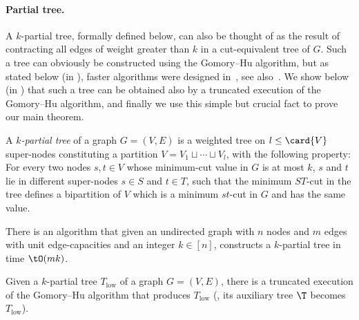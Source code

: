 \paragraph{Partial tree.}
A $k$-partial tree, formally defined below, can also be thought of as
the result of contracting all edges of weight greater than $k$
in a cut-equivalent tree of $G$.
Such a tree can obviously be constructed using the Gomory--Hu algorithm,
but as stated below (in ),
faster algorithms were designed in~\cite{HKP07,BHKP07},
see also~\cite[Theorem $3$]{Panigrahi16}.
We show below (in ) that such a tree
can be obtained also by a truncated execution of the Gomory--Hu algorithm,
and finally we use this simple but crucial fact to prove our main theorem.


\begin{definition}
  A \emph{$k$-partial tree} of a graph $G=(V,E)$ is a weighted tree on $l\leq \card{V}$ super-nodes constituting a partition $V=V_1 \sqcup\cdots\sqcup V_l$, with the following property:
  For every two nodes $s,t\in V$ whose minimum-cut value in $G$ is at most $k$, $s$ and $t$ lie in different super-nodes $s\in S$ and $t\in T$, such that the minimum $ST$-cut in the tree defines a bipartition of $V$
  which is a minimum $st$-cut in $G$ and has the same value.
\end{definition}

\begin{lemma}
\label{Lemma:Partial}
There is an algorithm that given an undirected graph with $n$ nodes and $m$ edges with unit edge-capacities and an integer $k\in [n]$, constructs a $k$-partial tree in time $\tO(mk)$.
\end{lemma}

\begin{lemma} \label{lem:truncatedGH}
  Given a $k$-partial tree $T_{\mathrm{low}}$ of a graph $G=(V,E)$, there is a truncated execution of the Gomory--Hu algorithm that produces $T_{\mathrm{low}}$ (\ie, its auxiliary tree $\T$ becomes $T_{\mathrm{low}}$).
\end{lemma}

